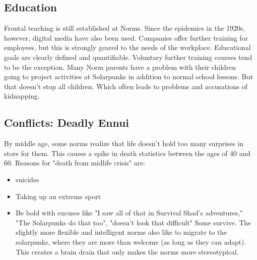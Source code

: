 \subsection{Education}
Frontal teaching is still established at Norms. Since the epidemics in the 1920s, however, digital media have also been used. Companies offer further training for employees, but this is strongly geared to the needs of the workplace.
Educational goals are clearly defined and quantifiable. Voluntary further training courses tend to be the exception. Many Norm parents have a problem with their children going to project activities at Solarpunks in addition to normal school lessons. But that doesn't stop all children. Which often leads to problems and accusations of kidnapping.

\subsection{Conflicts: Deadly Ennui}
By middle age, some norms realize that life doesn't hold too many surprises in store for them.
This causes a spike in death statistics between the ages of 40 and 60. Reasons for "death from midlife crisis" are:
\begin{itemize}
    \item suicides
    \item Taking up an extreme sport
    \item Be bold with excuses like "I saw all of that in Survival Shad's adventures," "The Solarpunks do that too", "doesn't look that difficult" Some survive. The slightly more flexible and intelligent norms also like to migrate to the solarpunks, where they are more than welcome (as long as they can adapt). This creates a brain drain that only makes the norms more stereotypical.
\end{itemize}

